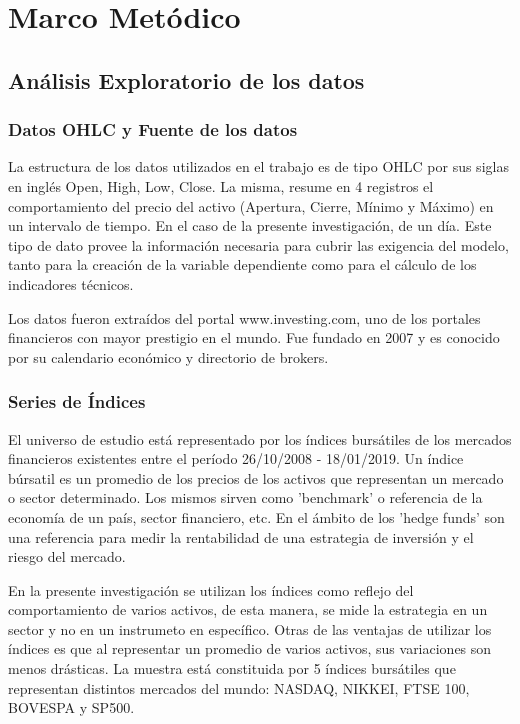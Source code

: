 \documentclass[a4paper,12pt]{Latex/Classes/PhDthesisPSnPDF}
\begin{document}
\chapter{Marco Metódico}
\section{Análisis Exploratorio de los datos}

\subsection{Datos OHLC y Fuente de los datos}

La estructura de los datos utilizados en el trabajo es de tipo OHLC por sus siglas en inglés Open, High, Low, Close. La misma, resume en 4 registros el comportamiento del precio del activo (Apertura, Cierre, Mínimo y Máximo) en un intervalo de tiempo. En el caso de la presente investigación, de un día. Este tipo de dato provee la información necesaria para cubrir las exigencia del modelo, tanto para la creación de la variable dependiente como para el cálculo de los indicadores técnicos. 

Los datos fueron extraídos del portal www.investing.com, uno de los portales financieros con mayor prestigio en el mundo. Fue fundado en 2007 y es conocido por su calendario económico y directorio de brokers.

\subsection{Series de Índices}

El universo de estudio está representado por los índices bursátiles de los mercados financieros existentes entre el período 26/10/2008 - 18/01/2019. Un índice búrsatil es un promedio de los precios de los activos que representan un mercado o sector determinado. Los mismos sirven como 'benchmark' o referencia de la economía de un país, sector financiero, etc. En el ámbito de los 'hedge funds' son una referencia para medir la rentabilidad de una estrategia de inversión y el riesgo del mercado.

En la presente investigación se utilizan los índices como reflejo del comportamiento de varios activos, de esta manera, se mide la estrategia en un sector y no en un instrumeto en específico. Otras de las ventajas de utilizar los índices es que al representar un promedio de varios activos, sus variaciones son menos drásticas. La muestra está constituida por 5 índices bursátiles que representan distintos mercados del mundo: NASDAQ, NIKKEI, FTSE 100, BOVESPA y SP500.
\end{document}
